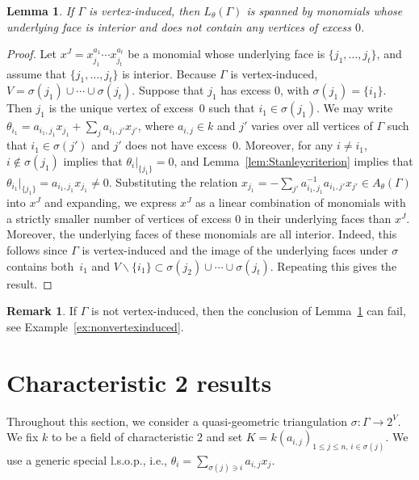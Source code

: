 \documentclass[11pt]{article}
\newtheorem{lemm}[theo]{Lemma}
\theoremstyle{definition}
\newtheorem{rema}[theo]{Remark}
\numberwithin{equation}{section}
\numberwithin{equation}{section}
\begin{document}
\begin{lemm}\label{lem:generation}
	If $\Gamma$ is vertex-induced, then $L_\theta(\Gamma)$ is spanned by monomials whose underlying face is interior and does not contain any vertices of excess $0$. 
\end{lemm}

\begin{proof}
	Let $x^J = x_{j_1}^{a_1} \dotsb x_{j_t}^{a_t}$ be a monomial whose underlying face is $\{j_1, \dotsc, j_t\}$, and assume that $\{j_1, \dotsc, j_t\}$ is interior. Because $\Gamma$ is vertex-induced, $V = \sigma(j_1) \cup \dotsb \cup \sigma(j_t)$. Suppose that $j_1$ has excess $0$, with $\sigma(j_1) = \{i_1\}$. Then $j_1$ is the unique vertex of excess~$0$ such that $i_1 \in \sigma(j_1)$. 
	We may write $\theta_{i_1} = a_{i_1,j_1} x_{j_1} + \sum_{j} a_{i_1,j'} x_{j'}$, where \mbox{$a_{i,j} \in k$} and  $j'$ varies over all vertices of $\Gamma$ such that $i_1 \in \sigma(j')$ and $j'$ does not have excess~$0$. 
	Moreover, for any $i \neq i_1$, $i \notin \sigma(j_1)$ implies that $\theta_i|_{\{j_1\}} = 0$, and Lemma~\ref{lem:Stanleycriterion} implies that $\theta_{i_1}|_{\{j_1\}} = a_{i_1,j_1} x_{j_1} \neq 0$.
	Substituting the relation 
	$x_{j_1} = -\sum_{j'} a_{i_1,j_1}^{-1}a_{i_1,j'} x_{j'} \in
	 A_{\theta}(\Gamma)$
	into $x^J$ and expanding, we express $x^J$ as a linear combination of monomials 
	with a strictly smaller number of vertices of excess $0$ in their underlying faces than $x^J$. Moreover, 
	the underlying faces of these monomials are all interior. Indeed, this follows since $\Gamma$ is vertex-induced and
	the image of the underlying faces under $\sigma$ contains both~$i_1$ and
	$V \smallsetminus \{ i_1 \} \subset \sigma(j_2) \cup \dotsb \cup \sigma(j_t)$. 
	Repeating this gives the result.
\end{proof}

\begin{rema}
	If $\Gamma$ is not vertex-induced, then the conclusion of Lemma~\ref{lem:generation} can fail, see Example~\ref{ex:nonvertexinduced}.
\end{rema}

\section{Characteristic 2 results}

Throughout this section, we consider a quasi-geometric triangulation $\sigma \colon \Gamma \to 2^V$. 
We fix $k$ to be a field of characteristic $2$ and set $K = k(a_{i,j})_{1 \le j \le n, \, i \in \sigma(j)}$. We use a generic special l.s.o.p., i.e., $\theta_i = \sum_{\sigma(j) \ni i} a_{i,j} x_j$. 
\end{document}
